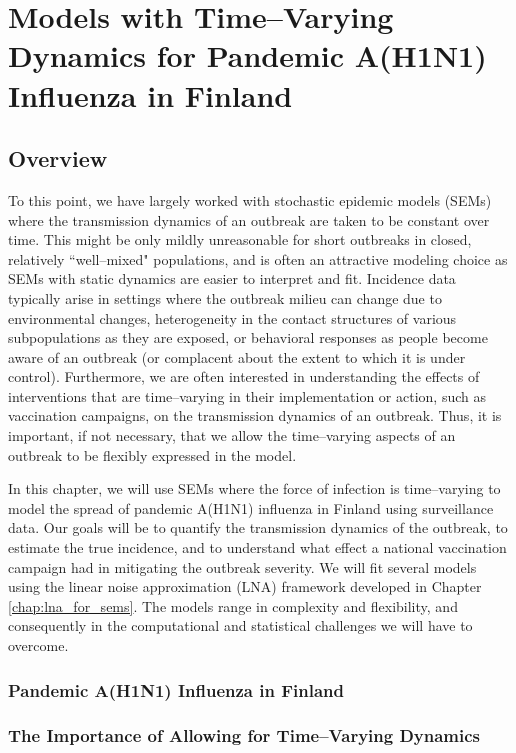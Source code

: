 \chapter{Models with Time--Varying Dynamics for Pandemic A(H1N1) Influenza in Finland}
\label{chap:lna_extensions}

\section{Overview}
\label{sec:lna_extensions_overview}
To this point, we have largely worked with stochastic epidemic models (SEMs) where the transmission dynamics of an outbreak are taken to be constant over time. This might be only mildly unreasonable for short outbreaks in closed, relatively ``well--mixed" populations, and is often an attractive modeling choice as SEMs with static dynamics are easier to interpret and fit. Incidence data typically arise in settings where the outbreak milieu can change due to environmental changes, heterogeneity in the contact structures of various subpopulations as they are exposed, or behavioral responses as people become aware of an outbreak (or complacent about the extent to which it is under control). Furthermore, we are often interested in understanding the effects of interventions that are time--varying in their implementation or action, such as vaccination campaigns, on the transmission dynamics of an outbreak. Thus, it is important, if not necessary, that we allow the time--varying aspects of an outbreak to be flexibly expressed in the model.

In this chapter, we will use SEMs where the force of infection is time--varying to model the spread of pandemic A(H1N1) influenza in Finland using surveillance data. Our goals will be to quantify the transmission dynamics of the outbreak, to estimate the true incidence, and to understand what effect a national vaccination campaign had in mitigating the outbreak severity. We will fit several models using the linear noise approximation (LNA) framework developed in Chapter \ref{chap:lna_for_sems}. The models range in complexity and flexibility, and consequently in the computational and statistical challenges we will have to overcome.

\subsection{Pandemic A(H1N1) Influenza in Finland}
\label{subsec:flu_description}

\subsection{The Importance of Allowing for Time--Varying Dynamics}
\label{subsec:tparam_motivation}



